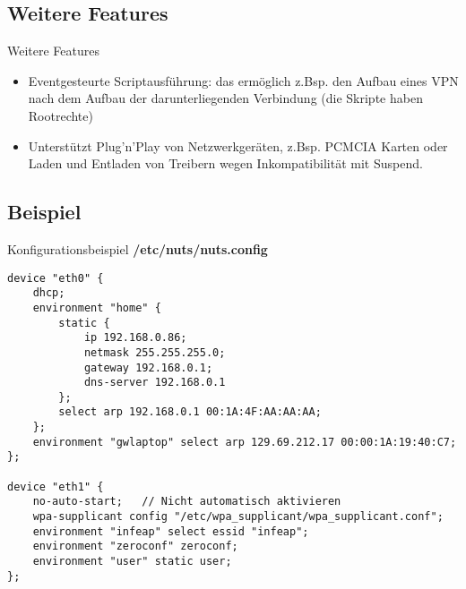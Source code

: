 \subsection{Weitere Features}
\begin{frame}[<+-|alert@+>]{Weitere Features}
	\begin{itemize}
		\item Eventgesteurte Scriptausführung: das ermöglich z.Bsp. den Aufbau eines VPN nach dem Aufbau der darunterliegenden Verbindung (die Skripte haben Rootrechte)
		\item Unterstützt Plug'n'Play von Netzwerkgeräten, z.Bsp. PCMCIA Karten oder Laden und Entladen von Treibern wegen Inkompatibilität mit Suspend.
	\end{itemize}
\end{frame}

\subsection{Beispiel}
\begin{frame}[fragile]{Konfigurationsbeispiel}
\textbf{/etc/nuts/nuts.config}
\tiny
\begin{verbatim}
device "eth0" {
    dhcp;
    environment "home" {
        static {
            ip 192.168.0.86;
            netmask 255.255.255.0;
            gateway 192.168.0.1;
            dns-server 192.168.0.1
        };
        select arp 192.168.0.1 00:1A:4F:AA:AA:AA;
    };
    environment "gwlaptop" select arp 129.69.212.17 00:00:1A:19:40:C7;
};

device "eth1" {
    no-auto-start;   // Nicht automatisch aktivieren
    wpa-supplicant config "/etc/wpa_supplicant/wpa_supplicant.conf";
    environment "infeap" select essid "infeap";
    environment "zeroconf" zeroconf;
    environment "user" static user;
};
\end{verbatim}
\end{frame}
